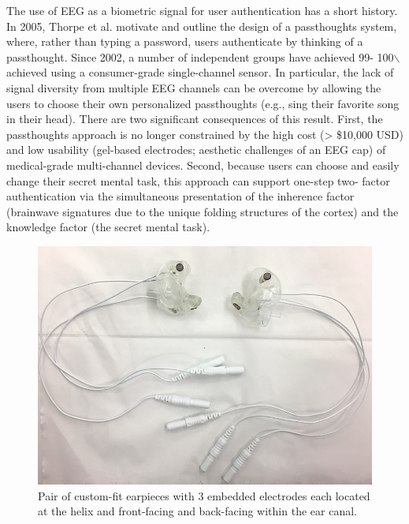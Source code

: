 \documentclass[letterpaper,twocolumn,10pt]{article}
\begin{document}
The use of EEG as a biometric signal for user authentication has a short history.
In 2005, Thorpe et al. motivate and outline the design of a passthoughts system,
where, rather than typing a password, users authenticate 
by thinking of a passthought. Since 2002, a number of independent groups have achieved 99-
100$\backslash$%
achieved using a consumer-grade single-channel sensor. In particular, the
lack of signal diversity from multiple EEG channels can be overcome by allowing
the users to choose their own personalized passthoughts (e.g., sing their favorite
song in their head). There are two significant consequences of this result. First,
the passthoughts approach is no longer constrained by the high cost (> \$10,000 USD)
and low usability (gel-based electrodes; aesthetic challenges of an EEG cap) of
medical-grade multi-channel devices. Second, because users can choose and
easily change their secret mental task, this approach can support one-step two-
factor authentication via the simultaneous presentation of the inherence factor
(brainwave signatures due to the unique folding structures of the cortex) and the
knowledge factor (the secret mental task).

\begin{figure}[htbp]
\centering
\includegraphics[width=.9\linewidth]{./figures/2EEEG.jpg}
\caption{Pair of custom-fit earpieces with 3 embedded electrodes each located at the helix and front-facing and back-facing within the ear canal.}
\end{figure}
\end{document}
